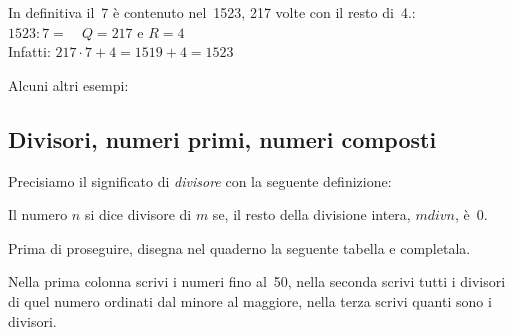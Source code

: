 In definitiva il~7 è contenuto nel~1523, 217 volte con il resto di~4.:\\
\(1523:7=\quad Q=217 \text{ e } R=4\)\\
Infatti: \(217 \cdot 7 + 4 = 1519 + 4 = 1523\)

Alcuni altri esempi:

\vspace{-6pt}
\begin{center}
\begin{inaccessibleblock}
 
\end{inaccessibleblock}
\end{center}
\vspace{-12pt}


\subsection{Divisori, numeri primi, numeri composti}

Precisiamo il significato di \emph{divisore} con la seguente definizione:

\begin{definizione}
 Il numero \(n\) si dice divisore di \(m\) se, il resto della divisione 
 intera,  \(m div n\), è~0.
\end{definizione}

Prima di proseguire, disegna nel quaderno la seguente tabella e completala. 
 
Nella prima colonna scrivi i numeri fino al~50, nella seconda scrivi tutti 
i divisori di quel numero ordinati dal minore al maggiore, nella terza 
scrivi quanti sono i divisori.

